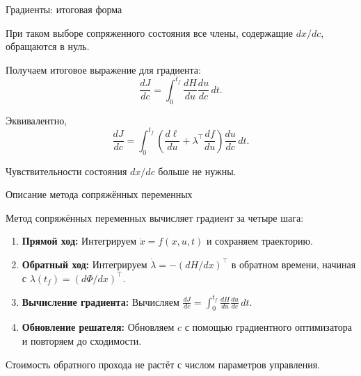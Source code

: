 \documentclass{beamer}
\begin{document}
	\begin{frame}{Градиенты: итоговая форма}
		\begin{flushleft}
			При таком выборе сопряженного состояния все члены, содержащие
			$dx/dc$, обращаются в нуль.
			
			\bigskip
			
			Получаем итоговое выражение для градиента:
			\[
			\boxed{
				\frac{dJ}{dc}
				=
				\int_0^{t_f}
				\frac{dH}{du}\frac{du}{dc}\,dt.
			}
			\]
			
			\bigskip
			
			Эквивалентно,
			\[
			\boxed{
				\frac{dJ}{dc}
				=
				\int_0^{t_f}
				\left(
				\frac{d\ell}{du}
				+\lambda^\top\frac{df}{du}
				\right)
				\frac{du}{dc}\,dt.
			}
			\]
			
			Чувствительности состояния $dx/dc$ больше не нужны.
		\end{flushleft}
	\end{frame}
	
	\begin{frame}{Описание метода сопряжённых переменных}
		\begin{flushleft}
			Метод сопряжённых переменных вычисляет градиент за четыре шага:
			
			\begin{enumerate}
				\item \textbf{Прямой ход:}
				Интегрируем $\dot{x}=f(x,u,t)$ и сохраняем траекторию.
				
				\item \textbf{Обратный ход:}
				Интегрируем $\dot{\lambda}=-(dH/dx)^\top$ в обратном времени,
				начиная с $\lambda(t_f)=(d\Phi/dx)^\top$.
				
				\item \textbf{Вычисление градиента:}
				Вычисляем $\displaystyle
				\frac{dJ}{dc}=\int_0^{t_f}
				\frac{dH}{du}\frac{du}{dc}\,dt$.
				
				\item \textbf{Обновление решателя:}
				Обновляем $c$ с помощью градиентного оптимизатора
				и повторяем до сходимости.
			\end{enumerate}
			
			\bigskip
			
			Стоимость обратного прохода не растёт с
			числом параметров управления.
		\end{flushleft}
	\end{frame}
	
\end{document}
